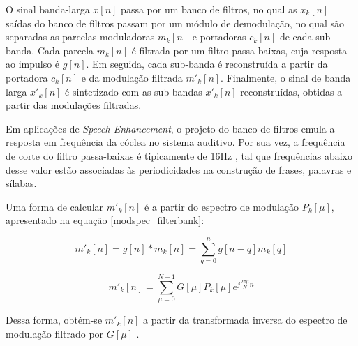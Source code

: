 O sinal banda-larga $x[n]$ passa por um banco de filtros, no qual as  $x_k[n]$
saídas do banco de filtros passam por um módulo de demodulação, no qual são
separadas as parcelas moduladoras $m_k[n]$ e portadoras $c_k[n]$ de cada
sub-banda. Cada parcela $m_k[n]$ é filtrada por um filtro passa-baixas, cuja
resposta ao impulso é $g[n]$. Em seguida, cada sub-banda é reconstruída a partir da portadora
$c_k[n]$ e da modulação filtrada $m'_k[n]$. Finalmente, o sinal de banda larga
$x'_k[n]$ é sintetizado com as sub-bandas $x'_k[n]$ reconstruídas, obtidas a
partir das modulações filtradas.

Em aplicações de \textit{Speech Enhancement}, o projeto do banco de filtros
emula a resposta em frequência da cóclea no sistema auditivo. Por sua vez, a
frequência de corte do filtro passa-baixas é tipicamente de 16Hz
\cite{drullman1994}, tal que frequências abaixo desse valor estão associadas às
periodicidades na construção de frases, palavras e sílabas.

Uma forma de calcular $m'_k[n]$ é a partir do espectro de modulação $P_k[\mu]$,
apresentado na equação \ref{modspec_filterbank}:

\begin{equation}
    m'_k[n] = g[n] \ast m_k[n] = \sum_{q = 0}^{n} g[n - q] m_k[q]
\end{equation}

\begin{equation}
    m'_k[n] = \sum_{\mu=0}^{N-1} G[\mu]P_k[\mu] e^{j \frac{2 \pi \mu}{N} n}
\end{equation}  

Dessa forma, obtém-se $m'_k[n]$ a partir da transformada inversa do espectro de
modulação filtrado por $G[\mu]$ \cite{toolbox2010}.

